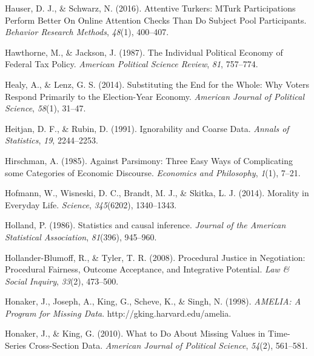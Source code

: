 \documentclass[12pt,econ]{sources/authesis}
\newenvironment{CSLReferences}%
  {}%
  {\par}
\begin{document}
\begin{CSLReferences}{1}{0}
\leavevmode{}%
Hauser, D. J., \& Schwarz, N. (2016). Attentive {Turkers}: {MTurk} {Participations} {Perform} {Better} {On} {Online} {Attention} {Checks} {Than} {Do} {Subject} {Pool} {Participants}. \emph{Behavior Research Methods}, \emph{48}(1), 400--407.

\leavevmode{}%
Hawthorne, M., \& Jackson, J. (1987). The {Individual} {Political} {Economy} of {Federal} {Tax} {Policy}. \emph{American Political Science Review}, \emph{81}, 757--774.

\leavevmode{}%
Healy, A., \& Lenz, G. S. (2014). {Substituting the End for the Whole: Why Voters Respond Primarily to the Election-Year Economy}. \emph{American Journal of Political Science}, \emph{58}(1), 31--47.

\leavevmode{}%
Heitjan, D. F., \& Rubin, D. (1991). {Ignorability and Coarse Data}. \emph{Annals of Statistics}, \emph{19}, 2244--2253.

\leavevmode{}%
Hirschman, A. (1985). Against {Parsimony}: {Three} {Easy} {Ways} of {Complicating} some {Categories} of {Economic} {Discourse}. \emph{Economics and Philosophy}, \emph{1}(1), 7--21.

\leavevmode{}%
Hofmann, W., Wisneski, D. C., Brandt, M. J., \& Skitka, L. J. (2014). {Morality in Everyday Life}. \emph{Science}, \emph{345}(6202), 1340--1343.

\leavevmode{}%
Holland, P. (1986). Statistics and causal inference. \emph{Journal of the American Statistical Association}, \emph{81}(396), 945--960.

\leavevmode{}%
Hollander-Blumoff, R., \& Tyler, T. R. (2008). {Procedural Justice in Negotiation: Procedural Fairness, Outcome Acceptance, and Integrative Potential}. \emph{Law \& Social Inquiry}, \emph{33}(2), 473--500.

\leavevmode{}%
Honaker, J., Joseph, A., King, G., Scheve, K., \& Singh, N. (1998). \emph{{AMELIA: A Program for Missing Data}}. http://gking.harvard.edu/amelia.

\leavevmode{}%
Honaker, J., \& King, G. (2010). {What to Do About Missing Values in Time-Series Cross-Section Data}. \emph{American Journal of Political Science}, \emph{54}(2), 561--581.


\end{CSLReferences}
\end{document}
